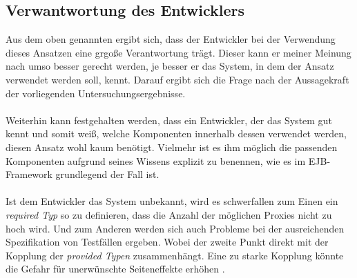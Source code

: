 \subsection{Verwantwortung des Entwicklers}
Aus dem oben genannten ergibt sich, dass der Entwickler bei der Verwendung dieses Ansatzen eine grgoße Verantwortung trägt. Dieser kann er meiner Meinung nach umso besser gerecht werden, je besser er das System, in dem der Ansatz verwendet werden soll, kennt. Darauf ergibt sich die Frage nach der Aussagekraft der vorliegenden Untersuchungsergebnisse.
\\\\
Weiterhin kann festgehalten werden, dass ein Entwickler, der das System gut kennt und somit weiß, welche Komponenten innerhalb dessen verwendet werden, diesen Ansatz wohl kaum benötigt. Vielmehr ist es ihm möglich die passenden Komponenten aufgrund seines Wissens explizit zu benennen, wie es im EJB-Framework grundlegend der Fall ist.
\\\\
Ist dem Entwickler das System unbekannt, wird es schwerfallen zum Einen ein \emph{required Typ} so zu definieren, dass die Anzahl der möglichen Proxies nicht zu hoch wird. Und zum Anderen werden sich auch Probleme bei der ausreichenden Spezifikation von Testfällen ergeben. Wobei der zweite Punkt direkt mit der Kopplung der \emph{provided Typen} zusammenhängt. Eine zu starke Kopplung könnte die Gefahr für unerwünschte Seiteneffekte erhöhen \cite{}.